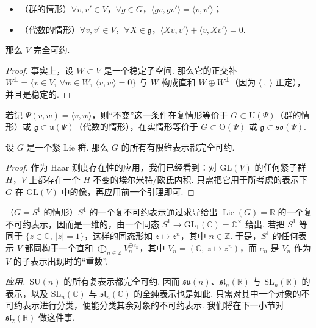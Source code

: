 \begin{numpara}[表示的约化]
\begin{lemma*}
\begin{itemize}[label=--]
\item （群的情形）$\forall v,v'\in V$，$\forall g\in G$，$\langle gv,gv'\rangle=\langle v,v'\rangle$；
\item （代数的情形）$\forall v,v'\in V$，$\forall X\in\mathfrak g$，$\langle Xv,v'\rangle+\langle v,Xv'\rangle=0$.
\end{itemize}
那么 $V$ 完全可约.
\end{lemma*}
\begin{proof}
事实上，设 $W\subset V$ 是一个稳定子空间. 那么它的正交补 $W^{\perp}=\{v\in V,\ \forall w\in W,\ \langle v,w\rangle=0\}$ 与 $W$ 构成直和 $W\oplus W^{\perp}$（因为 $\langle\ ,\ \rangle$ 正定），并且是稳定的.
\end{proof}
\begin{remark*}
若记 $\Psi(v,w)=\langle v,w\rangle$，则``不变''这一条件在复情形等价于 $G\subset\mathrm{U}(\Psi)$（群的情形）或 $\mathfrak g\subset\mathfrak u(\Psi)$（代数的情形），在实情形等价于 $G\subset\mathrm{O}(\Psi)$ 或 $\mathfrak g\subset\mathfrak{so}(\Psi)$.
\end{remark*}
\end{numpara}
\begin{corollary}\label{cor:lie-1-12-7}
设 $G$ 是一个紧 Lie 群. 那么 $G$ 的所有有限维表示都完全可约.
\end{corollary}
\begin{proof}
作为 Haar 测度存在性的应用，我们已经看到：对 $\mathrm{GL}(V)$ 的任何紧子群 $H$，$V$ 上都存在一个 $H$ 不变的埃尔米特/欧氏内积. 只需把它用于所考虑的表示下 $G$ 在 $\mathrm{GL}(V)$ 中的像，再应用前一个引理即可.
\end{proof}
\begin{example*}
（$G=S^{1}$ 的情形）$S^{1}$ 的一个复不可约表示通过求导给出 $\operatorname{Lie}(G)=\mathbb R$ 的一个复不可约表示，因而是一维的，由一个同态 $S^{1}\longrightarrow\mathrm{GL}_1(\mathbb C)=\mathbb C^{\times}$ 给出. 若把 $S^{1}$ 等同于 $\{z\in\mathbb C,\ |z|=1\}$，这样的同态形如 $z\mapsto z^{n}$，其中 $n\in\mathbb Z$. 于是，$S^{1}$ 的任何表示 $V$ 都同构于一个直和 $\bigoplus_{n\in\mathbb Z}V_{n}^{\oplus e_{n}}$，其中 $V_{n}=(\mathbb C,\ z\mapsto z^{n})$，而 $e_{n}$ 是 $V_{n}$ 作为 $V$ 的子表示出现时的``重数''.
\end{example*}
\emph{应用.}\ $\mathrm{SU}(n)$ 的所有复表示都完全可约. 因而 $\mathfrak{su}(n)$、$\mathfrak{sl}_n(\mathbb R)$ 与 $\mathrm{SL}_n(\mathbb R)$ 的表示，以及 $\mathrm{SL}_n(\mathbb C)$ 与 $\mathfrak{sl}_n(\mathbb C)$ 的全纯表示也是如此. 只需对其中一个对象的不可约表示进行分类，便能分类其余对象的不可约表示. 我们将在下一小节对 $\mathfrak{sl}_2(\mathbb R)$ 做这件事.

